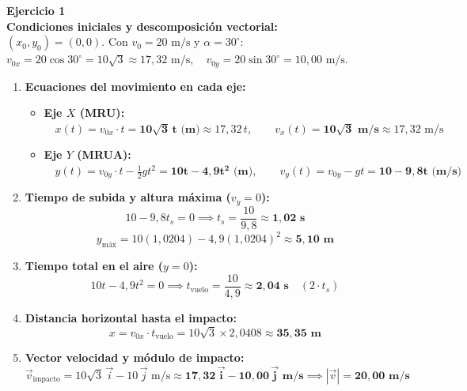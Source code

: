 \documentclass[11pt,a4paper]{article}
\begin{document}
\pagestyle{empty}

\noindent\textbf{Ejercicio 1}\\
\textbf{Condiciones iniciales y descomposición vectorial:}\\
$(x_0, y_0) = (0, 0)$. Con $v_0 = 20\text{ m/s}$ y $\alpha = 30^\circ$:\\
$v_{0x} = 20 \cos 30^\circ = 10\sqrt{3} \approx 17{,}32\text{ m/s}, \quad v_{0y} = 20 \sin 30^\circ = 10{,}00\text{ m/s}$.

\begin{enumerate}[label=\textbf{\alph*)}, leftmargin=2em, itemsep=6pt]
    \item \textbf{Ecuaciones del movimiento en cada eje:}
    \begin{itemize}[leftmargin=1.5em, itemsep=3pt]
        \item \textbf{Eje $X$ (MRU):} $\quad x(t) = v_{0x} \cdot t = \mathbf{10\sqrt{3}\,t\text{ (m)}} \approx 17{,}32\,t, \qquad v_x(t) = \mathbf{10\sqrt{3}\text{ m/s}} \approx 17{,}32\text{ m/s}$
        \item \textbf{Eje $Y$ (MRUA):} $\quad y(t) = v_{0y} \cdot t - \frac{1}{2}gt^2 = \mathbf{10t - 4{,}9t^2\text{ (m)}}, \qquad v_y(t) = v_{0y} - gt = \mathbf{10 - 9{,}8t\text{ (m/s)}}$
    \end{itemize}
    \item \textbf{Tiempo de subida y altura máxima ($v_y = 0$):}
    \[
    10 - 9{,}8t_s = 0 \implies t_s = \frac{10}{9{,}8} \approx \mathbf{1{,}02\text{ s}}
    \]
    \[
    y_{\text{máx}} = 10(1{,}0204) - 4{,}9(1{,}0204)^2 \approx \mathbf{5{,}10\text{ m}}
    \]
    \item \textbf{Tiempo total en el aire ($y = 0$):}
    \[
    10t - 4{,}9t^2 = 0 \implies t_{\text{vuelo}} = \frac{10}{4{,}9} \approx \mathbf{2{,}04\text{ s}} \quad (2 \cdot t_s)
    \]
    \item \textbf{Distancia horizontal hasta el impacto:}
    \[
    x = v_{0x} \cdot t_{\text{vuelo}} = 10\sqrt{3} \times 2{,}0408 \approx \mathbf{35{,}35\text{ m}}
    \]
    \item \textbf{Vector velocidad y módulo de impacto:}
    \[
    \vec{v}_{\text{impacto}} = 10\sqrt{3}\,\vec{i} - 10\,\vec{j}\text{ m/s} \approx \mathbf{17{,}32\,\vec{i} - 10{,}00\,\vec{j}\text{ m/s}} \implies |\vec{v}| = \mathbf{20{,}00\text{ m/s}}
    \]
\end{enumerate}
\end{document}
